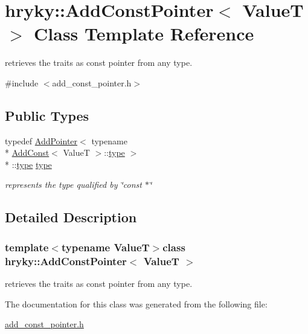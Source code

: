 \hypertarget{classhryky_1_1_add_const_pointer}{\section{hryky\-:\-:Add\-Const\-Pointer$<$ Value\-T $>$ Class Template Reference}
\label{classhryky_1_1_add_const_pointer}
}


retrieves the traits as const pointer from any type.  




{\ttfamily \#include $<$add\-\_\-const\-\_\-pointer.\-h$>$}

\subsection*{Public Types}
\begin{DoxyCompactItemize}
\item 
\hypertarget{classhryky_1_1_add_const_pointer_a62e5c44fefac145f6bd2460e4c8d0ba2}{typedef \hyperlink{classhryky_1_1_add_pointer}{Add\-Pointer}$<$ typename \\*
\hyperlink{classhryky_1_1_add_const}{Add\-Const}$<$ Value\-T $>$\-::\hyperlink{classhryky_1_1_add_const_pointer_a62e5c44fefac145f6bd2460e4c8d0ba2}{type} $>$\\*
\-::\hyperlink{classhryky_1_1_add_const_pointer_a62e5c44fefac145f6bd2460e4c8d0ba2}{type} \hyperlink{classhryky_1_1_add_const_pointer_a62e5c44fefac145f6bd2460e4c8d0ba2}{type}}\label{classhryky_1_1_add_const_pointer_a62e5c44fefac145f6bd2460e4c8d0ba2}

\begin{DoxyCompactList}\small\item\em represents the type qualified by \char`\"{}const $\ast$\char`\"{} \end{DoxyCompactList}\end{DoxyCompactItemize}


\subsection{Detailed Description}
\subsubsection*{template$<$typename Value\-T$>$class hryky\-::\-Add\-Const\-Pointer$<$ Value\-T $>$}

retrieves the traits as const pointer from any type. 

The documentation for this class was generated from the following file\-:\begin{DoxyCompactItemize}
\item 
\hyperlink{add__const__pointer_8h}{add\-\_\-const\-\_\-pointer.\-h}\end{DoxyCompactItemize}
